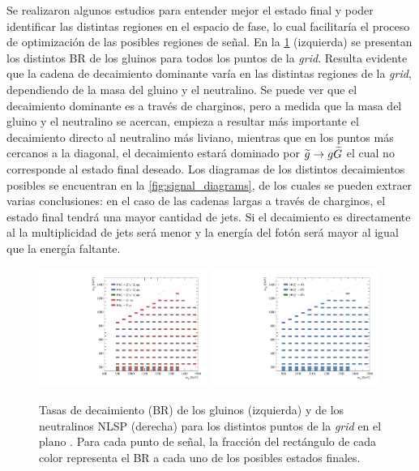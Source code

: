 Se realizaron algunos estudios para entender mejor el estado final y poder
identificar las distintas regiones en el espacio de fase, lo cual facilitaría el
proceso de optimización de las posibles regiones de se\~nal. En la
\cref{fig:signal_br} (izquierda) se presentan los distintos BR de los gluinos para todos
los puntos de la \emph{grid}. Resulta evidente que la cadena de decaimiento dominante
varía en las distintas regiones de la \emph{grid}, dependiendo de la masa del gluino y
el neutralino. Se puede ver que el decaimiento dominante es a través de
charginos, pero a medida que la masa del gluino y el neutralino se acercan,
empieza a resultar más importante el decaimiento directo al neutralino más
liviano, mientras que en los puntos más cercanos a la diagonal, el decaimiento
estará dominado por $\widetilde{g}\rightarrow g\widetilde{G}$ el cual no corresponde al estado
final deseado. Los diagramas de los distintos decaimientos posibles se encuentran
en la \cref{fig:signal_diagrams}, de los cuales se pueden extraer varias
conclusiones: en el caso de las cadenas largas a través de charginos, el estado
final tendrá una mayor cantidad de jets. Si el decaimiento es directamente al
{\ninoone} la multiplicidad de jets será menor y la energía del fotón será mayor
al igual que la energía faltante.


\begin{figure}[!htb]
  \centering

  \includegraphics[width=0.49\textwidth]{figures/br_gl_X}
  \includegraphics[width=0.49\textwidth]{figures/br_n1_X}

  \caption{Tasas de decaimiento (BR) de los gluinos (izquierda) y
    de los neutralinos NLSP (derecha)
    para los distintos puntos de la \emph{grid} en el plano \mgmn.
    Para cada punto de señal, la fracción del rectángulo de cada color representa
    el BR a cada uno de los posibles estados finales.}
  \label{fig:signal_br}
\end{figure}


